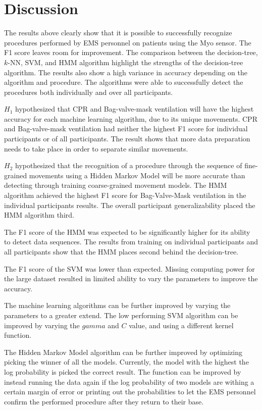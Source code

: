 \section{Discussion}
\label{sec:Results:Discussion}
The results above clearly show that it is possible to successfully recognize procedures performed by EMS personnel on patients using the Myo sensor. The F1 score leaves room for improvement. The comparison between the decision-tree, $k$-NN, SVM, and HMM algorithm highlight the strengths of the decision-tree algorithm. The results also show a high variance in accuracy depending on the algorithm and procedure. The algorithms were able to successfully detect the procedures both individually and over all participants.
\par $H_1$ hypothesized that CPR and Bag-valve-mask ventilation will have the highest accuracy for each machine learning algorithm, due to its unique movements. CPR and Bag-valve-mask ventilation had neither the highest F1 score for individual participants or of all participants. The result shows that more data preparation needs to take place in order to separate similar movements. 
\par $H_2$ hypothesized that the recognition of a procedure through the sequence of fine-grained movements using a Hidden Markov Model will be more accurate than detecting through training coarse-grained movement models. The HMM algorithm achieved the highest F1 score for Bag-Valve-Mask ventilation in the individual participants results. The overall participant generalizability placed the HMM algorithm third.
\par The F1 score of the HMM was expected to be significantly higher for its ability to detect data sequences. The results from training on individual participants and all participants show that the HMM places second behind the decision-tree.
\par The F1 score of the SVM was lower than expected. Missing computing power for the large dataset resulted in limited ability to vary the parameters to improve the accuracy. 
\par The machine learning algorithms can be further improved by varying the parameters to a greater extend. The low performing SVM algorithm can be improved by varying the $gamma$ and $C$ value, and using a different kernel function.
\par The Hidden Markov Model algorithm can be further improved by optimizing picking the winner of all the models. Currently, the model with the highest the log probability is picked the correct result. The function can be improved by instead running the data again if the log probability of two models are withing a certain margin of error or printing out the probabilities to let the EMS personnel confirm the performed procedure after they return to their base.
